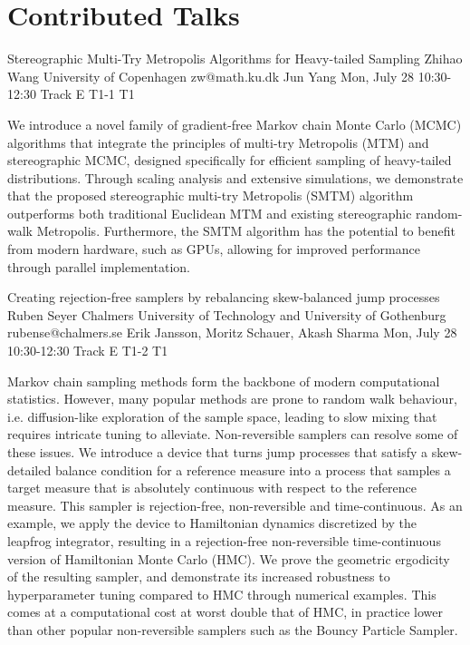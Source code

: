 \chapter{Contributed Talks}
\newpage

\begin{talk}
  {Stereographic Multi-Try Metropolis Algorithms for Heavy-tailed Sampling}%
  {Zhihao Wang}%
  {University of Copenhagen}%
  {zw@math.ku.dk}%
  {Jun Yang}%
  {}%
  {Mon, July 28 10:30-12:30 Track E}%
  {T1-1}%
  {T1}%
  
				
			
We introduce a novel family of gradient-free Markov chain Monte Carlo (MCMC) algorithms that integrate the principles of multi-try Metropolis (MTM) and stereographic MCMC, designed specifically for efficient sampling of heavy-tailed distributions. Through scaling analysis and extensive simulations, we demonstrate that the proposed stereographic multi-try Metropolis (SMTM) algorithm outperforms both traditional Euclidean MTM and existing stereographic random-walk Metropolis. Furthermore, the SMTM algorithm has the potential to benefit from modern hardware, such as GPUs, allowing for improved performance through parallel implementation.
\end{talk}

\begin{talk}
  {Creating rejection-free samplers by rebalancing skew-balanced jump processes}%
  {Ruben Seyer}%
  {Chalmers University of Technology and University of Gothenburg}%
  {rubense@chalmers.se}%
  {Erik Jansson, Moritz Schauer, Akash Sharma}%
  {}%
  {Mon, July 28 10:30-12:30 Track E}%
  {T1-2}%
  {T1}%
  
				
			
Markov chain sampling methods form the backbone of modern computational statistics.
However, many popular methods are prone to random walk behaviour, i.e.\@{} diffusion-like exploration of the sample space, leading to slow mixing that requires intricate tuning to alleviate.
Non-reversible samplers can resolve some of these issues.
We introduce a device that turns jump processes that satisfy a skew-detailed balance condition for a reference measure into a process that samples a target measure that is absolutely continuous with respect to the reference measure.
This sampler is rejection-free, non-reversible and time-continuous.
As an example, we apply the device to Hamiltonian dynamics discretized by the leapfrog integrator, resulting in a rejection-free non-reversible time-continuous version of Hamiltonian Monte Carlo (HMC).
We prove the geometric ergodicity of the resulting sampler, and demonstrate its increased robustness to hyperparameter tuning compared to HMC through numerical examples.
This comes at a computational cost at worst double that of HMC, in practice lower than other popular non-reversible samplers such as the Bouncy Particle Sampler.
\end{talk}

